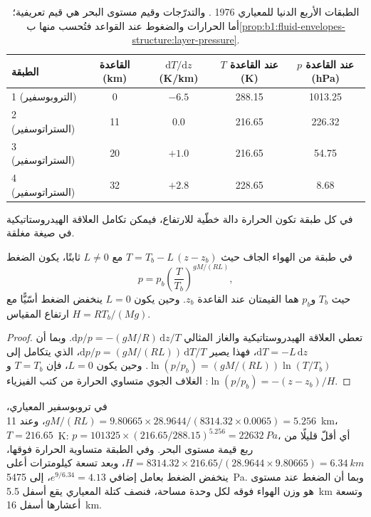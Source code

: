 \begin{table}[ht]
\centering
\small
\renewcommand{\arraystretch}{1.2}
\begin{tabular}{|l|c|c|c|c|}
\hline
الطبقة & القاعدة (km) & $\mathrm dT/\mathrm dz$ (K/km) & $T$ عند القاعدة (K) & $p$ عند القاعدة (hPa) \\
\hline
1 (التروبوسفير) & 0 & $-6.5$ & 288.15 & 1013.25 \\
2 (الستراتوسفير) & 11 & 0.0 & 216.65 & 226.32 \\
3 (الستراتوسفير) & 20 & $+1.0$ & 216.65 & 54.75 \\
4 (الستراتوسفير) & 32 & $+2.8$ & 228.65 & 8.68 \\
\hline
\end{tabular}
\caption{الطبقات الأربع الدنيا للمعياري 1976 . والتدرّجات وقيم مستوى البحر هي قيم تعريفية؛ أما الحرارات والضغوط عند القواعد فتُحسب منها ب\cref{prop:b1:fluid-envelopes-structure:layer-pressure}.}
\label{tab:b1:fluid-envelopes-structure:layers}
\end{table}

في كل طبقة تكون الحرارة دالة خطّية للارتفاع، فيمكن تكامل العلاقة الهيدروستاتيكية في صيغة مغلقة.

\begin{proposition}\label{prop:b1:fluid-envelopes-structure:layer-pressure}
في طبقة من الهواء الجاف حيث $T = T_b - L\,(z - z_b)$ مع $L \neq 0$ ثابتًا، يكون الضغط
\[
  p = p_b \left(\frac{T}{T_b}\right)^{gM/(RL)},
\]
حيث $T_b$ و$p_b$ هما القيمتان عند القاعدة $z_b$. وحين يكون $L = 0$ ينخفض الضغط أسّيًّا مع ارتفاع المقياس $H = RT_b/(Mg)$.
\end{proposition}

\begin{proof}
تعطي العلاقة الهيدروستاتيكية والغاز المثالي $\mathrm dp/p = -(gM/R)\,\mathrm
dz/T$. وبما أن $\mathrm dT = -L\,\mathrm dz$، فهذا يصير $\mathrm dp/p =
(gM/(RL))\,\mathrm dT/T$، الذي يتكامل إلى $\ln(p/p_b) = (gM/(RL))
\ln(T/T_b)$. وحين يكون $L = 0$، فإن $T = T_b$ و$\ln(p/p_b) = -(z - z_b)/H$: الغلاف الجوي متساوي الحرارة من كتب الفيزياء.
\end{proof}

في تروبوسفير المعياري، $gM/(RL) = 9.80665 \times 28.9644 /
(8314.32 \times 0.0065) = 5.256$، وعند \qty{11}{km}، $T = 216.65$~K:
$p = \num{101325} \times (216.65/288.15)^{5.256} = \qty{22632}{Pa}$، أي أقلّ قليلًا من ربع قيمة مستوى البحر. وفي الطبقة متساوية الحرارة فوقها، $H =
8314.32 \times 216.65/(28.9644 \times 9.80665) = \qty{6.34}{km}$، وبعد تسعة كيلومترات أعلى ينخفض الضغط بعامل إضافي $e^{9/6.34} =
4.13$، إلى \qty{5475}{Pa}. وبما أن الضغط عند مستوى هو وزن الهواء فوقه لكل وحدة مساحة، فنصف كتلة المعياري يقع أسفل \qty{5.5}{km} وتسعة أعشارها أسفل \qty{16}{km}.

